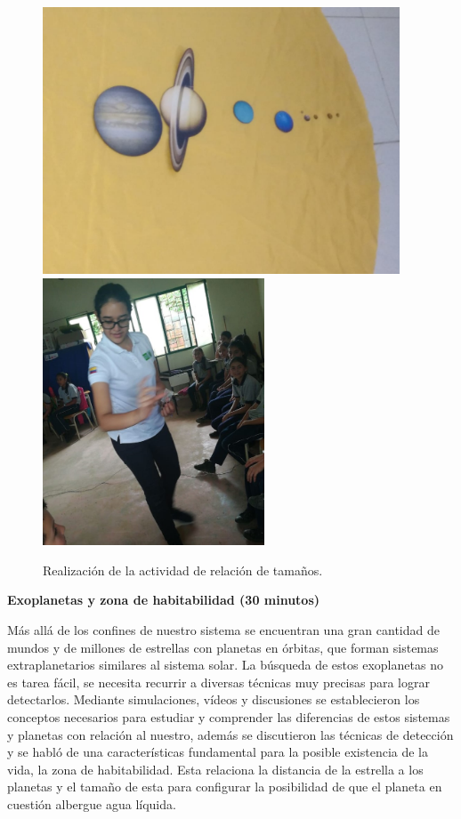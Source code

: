 \documentclass[a4paper,10pt]{article}
\begin{document}
\begin{figure}[H]
    \centering
    \includegraphics[width=10.6cm]{clavellinas/tamanos.jpeg}
    \includegraphics[width=6.6cm]{clavellinas/tamanos-1.jpg}
    \caption{Realización de la actividad de relación de tamaños.}
\end{figure}



\vspace{2mm}


\noindent \textbf{Exoplanetas y zona de habitabilidad (30 minutos)}

\vspace{2mm}

\noindent Más allá de los confines de nuestro sistema se encuentran una gran cantidad de mundos y de millones de estrellas con planetas en órbitas, que forman sistemas extraplanetarios similares al sistema solar. La búsqueda de estos exoplanetas no es tarea fácil, se necesita recurrir a diversas técnicas muy precisas para lograr detectarlos. Mediante simulaciones, vídeos y discusiones se establecieron los conceptos necesarios para estudiar y comprender las diferencias de estos sistemas y planetas con relación al nuestro, además se discutieron las técnicas de detección y se habló de una características fundamental para la posible existencia de la vida, la zona de habitabilidad. Esta relaciona la distancia de la estrella a los planetas y el tamaño de esta para configurar la posibilidad de que el planeta en cuestión albergue agua líquida.
\end{document}
